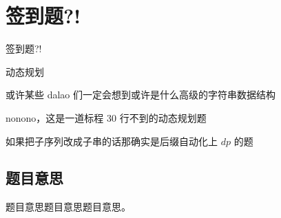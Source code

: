 \def\sectionName{签到题?!}
\section[\TOCName]{\sectionName}



\begin{frame}

\isBeamerMode\relax
    {\Huge \sectionName}\par
\fi




动态规划

或许某些 dalao 们一定会想到或许是什么高级的字符串数据结构

nonono，这是一道标程 30 行不到的动态规划题

如果把子序列改成子串的话那确实是后缀自动化上 $dp$ 的题



\end{frame}

\subsection{题目意思}
\begin{frame} %
题目意思题目意思题目意思。
\end{frame}



